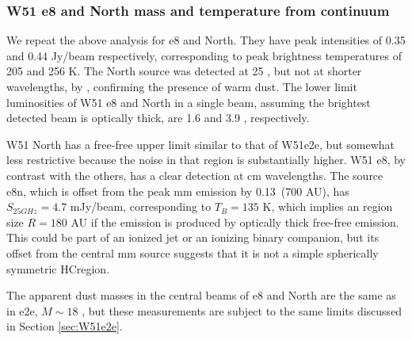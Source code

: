 \documentclass{emulateapj}
\begin{document}
\subsubsection{W51 e8 and North mass and temperature from continuum}
\label{sec:w51e8andnorth}
We repeat the above analysis for e8 and North.  They have peak intensities
of 0.35 and 0.44 Jy/beam respectively, corresponding to peak brightness
temperatures of 205 and 256 K.  The North source was detected at 25 \um, but
not at shorter wavelengths, by \citet{Barbosa2016a}, confirming the presence
of warm dust.
The lower limit luminosities of W51 e8 and North in a single beam, assuming the
brightest detected beam is optically thick, are 1.6 and 3.9 \lsun,
respectively.


W51 North has a free-free upper limit similar to that of W51e2e, but somewhat less
restrictive because the noise in that region is substantially higher.  W51 e8,
by contrast with the others, has a clear detection at cm wavelengths.  The
source e8n, which is offset from the peak mm emission by 0.13\arcsec\ (700 AU),
has $S_{25 GHz}=4.7$ mJy/beam, corresponding to $T_B=135$ K, which implies an
\hii region size $R=180$ AU if the emission is produced by  optically thick
free-free emission.  This could be part of an ionized jet or an ionizing binary
companion, but its offset from the central mm source
suggests that it is not a simple spherically symmetric HC\hii region.

The apparent dust masses in the central beams of e8 and North are the same
as in e2e, $M\sim18$ \msun, but these measurements are subject to the same
limits discussed in Section \ref{sec:W51e2e}.
\end{document}
